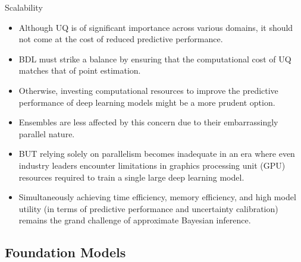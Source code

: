 \documentclass[9pt]{beamer}
\begin{document}
\begin{frame}{Scalability}
\begin{itemize}[<+->]
	\item Although UQ is of significant importance across various domains, it should not come at the cost of \alert{reduced predictive performance}. 
	\item BDL must \alert{strike a balance} by ensuring that the computational cost of UQ matches that of point estimation.
	\item Otherwise, investing computational resources to improve the predictive performance of deep learning models might be a more prudent option. 
	\item Ensembles are less affected by this concern due to their \alert{embarrassingly parallel} nature. 
	\item BUT relying solely on \alert{parallelism} becomes \alert{inadequate} in an era where even industry leaders encounter limitations in graphics processing unit (GPU) resources required to train a single large deep learning model. %
	\item Simultaneously achieving \alert{time efficiency, memory efficiency, and high model utility} (in terms of predictive performance and uncertainty calibration) remains the \alert{grand challenge} of approximate Bayesian inference. %
\end{itemize}
\end{frame}


\subsection{Foundation Models}
\end{document}
